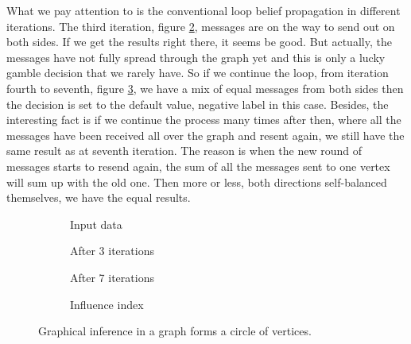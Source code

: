 What we pay attention to is the conventional loop belief propagation in different iterations. The third iteration, figure \ref{fig4b: synthetic data: circle}, messages are on the way to send out on both sides. If we get the results right there, it seems be good. But actually, the messages have not fully spread through the graph yet and this is only a lucky gamble decision that we rarely have. So if we continue the loop, from iteration fourth to seventh, figure \ref{fig4c: synthetic data: circle}, we have a mix of equal messages from both sides then the decision is set to the default value, negative label in this case. Besides, the interesting fact is if we continue the process many times after then, where all the messages have been received all over the graph and resent again, we still have the same result as at seventh iteration. The reason is when the new round of messages starts to resend again, the sum of all the messages sent to one vertex will sum up with the old one. Then more or less, both directions self-balanced themselves, we have the equal results.

\begin{figure}[t!]
	\centering
	\captionsetup[subfigure]{justification=centering}
	\begin{subfigure}[b]{0.24\textwidth}
		\centering
		
		\caption{Input data}
		\label{fig4a: synthetic data: circle}
	\end{subfigure}
	\hfill
	\begin{subfigure}[b]{0.24\textwidth}
		\centering
		
		\caption{After 3 iterations}
		\label{fig4b: synthetic data: circle}
	\end{subfigure}
	\hfill
	\begin{subfigure}[b]{0.24\textwidth}
		\centering
		
		\caption{After 7 iterations}
		\label{fig4c: synthetic data: circle}
	\end{subfigure}
	\hfill
	\begin{subfigure}[b]{0.24\textwidth}
		\centering
		
		\caption{Influence index}
		\label{fig4d: synthetic data: circle}
	\end{subfigure}
	\caption{Graphical inference in a graph forms a circle of vertices.}
	\label{fig4: synthetic data: circle}
\end{figure}

